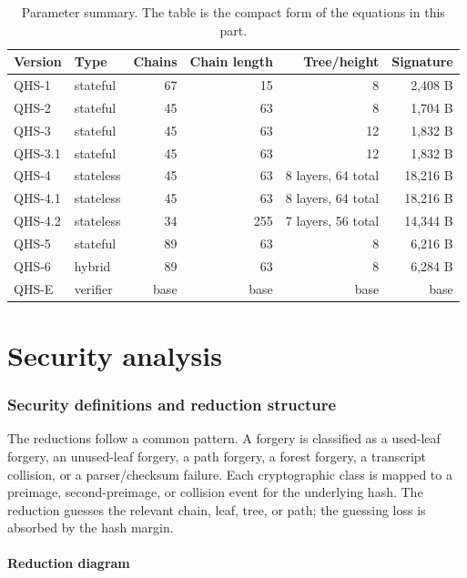 \documentclass[11pt,a4paper]{article}
\theoremstyle{remark}
\begin{document}
\begin{table}[ht]
\centering
\caption{Parameter summary. The table is the compact form of the equations in
this part.}
\label{tab:params}
\small
\begin{tabularx}{\textwidth}{@{}l l r r r r@{}}
\toprule
Version & Type & Chains & Chain length & Tree/height & Signature\\
\midrule
QHS-1 & stateful & 67 & 15 & 8 & 2,408 B\\
QHS-2 & stateful & 45 & 63 & 8 & 1,704 B\\
QHS-3 & stateful & 45 & 63 & 12 & 1,832 B\\
QHS-3.1 & stateful & 45 & 63 & 12 & 1,832 B\\
QHS-4 & stateless & 45 & 63 & 8 layers, 64 total & 18,216 B\\
QHS-4.1 & stateless & 45 & 63 & 8 layers, 64 total & 18,216 B\\
QHS-4.2 & stateless & 34 & 255 & 7 layers, 56 total & 14,344 B\\
QHS-5 & stateful & 89 & 63 & 8 & 6,216 B\\
QHS-6 & hybrid & 89 & 63 & 8 & 6,284 B\\
QHS-E & verifier & base & base & base & base\\
\bottomrule
\end{tabularx}
\end{table}

\part{Security analysis}

\section{Security definitions and reduction structure}

The reductions follow a common pattern. A forgery is classified as a used-leaf
forgery, an unused-leaf forgery, a path forgery, a forest forgery, a transcript
collision, or a parser/checksum failure. Each cryptographic class is mapped to a
preimage, second-preimage, or collision event for the underlying hash. The
reduction guesses the relevant chain, leaf, tree, or path; the guessing loss is
absorbed by the hash margin.

\subsection{Reduction diagram}
\end{document}
